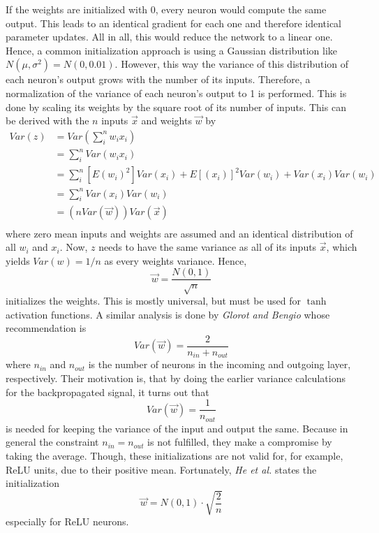 If the weights are initialized with 0, every neuron would compute the same output.
This leads to an identical gradient for each one and therefore identical parameter updates.
All in all, this would reduce the network to a linear one.
Hence, a common initialization approach is using a Gaussian distribution like $N(\mu, \sigma^2) = N(0, 0.01)$.
However, this way the variance of this distribution of each neuron's output grows with the number of its inputs.
Therefore, a normalization of the variance of each neuron's output to 1 is performed.
This is done by scaling its weights by the square root of its number of inputs.
This can be derived with the $n$ inputs $\vec{x}$ and weights $\vec{w}$ by
\begin{align*}
	Var(z) &= Var \left( \sum_{i}^{n} w_i x_i \right) \\
	&= \sum_{i}^{n} Var \left( w_i x_i \right) \\
	&= \sum_{i}^{n} \left[ E(w_i)^2 \right] Var(x_i) + E \left[ (x_i) \right]^2 Var(w_i) + Var(x_i) Var(w_i) \\
	&= \sum_{i}^{n} Var(x_i) Var(w_i) \\
	&= (n Var(\vec{w})) Var(\vec{x}) \\
\end{align*}
where zero mean inputs and weights are assumed and an identical distribution of all $w_i$ and $x_i$.
Now, $z$ needs to have the same variance as all of its inputs $\vec{x}$, which yields $Var(w) = 1/n$ as every weights variance.
Hence,
\begin{equation}
	\vec{w} = \frac{N(0,1)}{\sqrt{n}}
\end{equation}
initializes the weights.
This is mostly universal, but must be used for $\tanh$ activation functions.
A similar analysis is done by \textit{Glorot and Bengio} \cite{Glorot10understandingthe} whose recommendation is
\begin{equation*}
	Var(\vec{w}) = \frac{2}{n_{in} + n_{out}}
\end{equation*}
where $n_{in}$ and $n_{out}$ is the number of neurons in the incoming and outgoing layer, respectively.
Their motivation is, that by doing the earlier variance calculations for the backpropagated signal, it turns out that
\begin{equation}
	Var(\vec{w}) = \frac{1}{n_{out}}
\end{equation}
is needed for keeping the variance of the input and output the same.
Because in general the constraint $n_{in} = n_{out}$ is not fulfilled, they make a compromise by taking the average.
Though, these initializations are not valid for, for example, ReLU units, due to their positive mean.
Fortunately, \textit{He et al.} \cite{DBLP:journals/corr/HeZR015} states the initialization
\begin{equation}
	\vec{w} = N(0,1) \cdot \sqrt{\frac{2}{n}}
\end{equation}
especially for ReLU neurons.